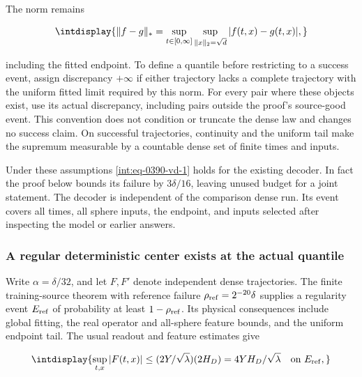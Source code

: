 
The norm remains


\begingroup\renewcommand{\theHequation}{intdisplay.802}
\begin{equation*}
\intdisplay{
\|f-g\|_*=
\sup_{t\in[0,\infty]}\sup_{\|x\|_2=\sqrt d}|f(t,x)-g(t,x)|,
}
\end{equation*}
\endgroup


including the fitted endpoint. To define a quantile before restricting to a success event, assign discrepancy \(+\infty\) if either trajectory lacks a complete trajectory with the uniform fitted limit required by this norm. For every pair where these objects exist, use its actual discrepancy, including pairs outside the proof's source-good event. This convention does not condition or truncate the dense law and changes no success claim. On successful trajectories, continuity and the uniform tail make the supremum measurable by a countable dense set of finite times and inputs.



Under these assumptions \eqref{int:eq-0390-vd-1} holds for the existing decoder. In fact the proof below bounds its failure by \(3\delta/16\), leaving unused budget for a joint statement. The decoder is independent of the comparison dense run. Its event covers all times, all sphere inputs, the endpoint, and inputs selected after inspecting the model or earlier answers.


\subsubsection{A regular deterministic center exists at the actual quantile}



Write \(\alpha=\delta/32\), and let \(F,\allowbreak F'\) denote independent dense trajectories. The finite training-source theorem with reference failure \(\rho_{\rm ref}=2^{-20}\delta\) supplies a regularity event \(E_{\rm ref}\) of probability at least \(1-\rho_{\rm ref}\). Its physical consequences include global fitting, the real operator and all-sphere feature bounds, and the uniform endpoint tail. The usual readout and feature estimates give


\begingroup\renewcommand{\theHequation}{intdisplay.803}
\begin{equation*}
\intdisplay{
\sup_{t,x}|F(t,x)|
 \le (2Y/\sqrt\lambda)(2H_D)=4YH_D/\sqrt\lambda
\quad\hbox{on }E_{\rm ref},
}
\end{equation*}
\endgroup

